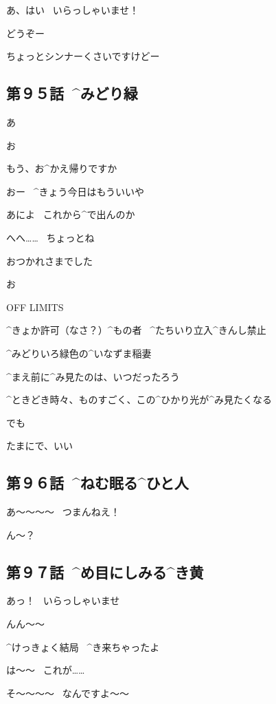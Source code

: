 \Alpha あ、はい
\ いらっしゃいませ！

\Alpha どうぞー

\Alpha ちょっとシンナーくさいですけどー


\subsection{第９５話\ ^{みどり}{緑}}

\page[107]
\Alpha あ

\Ojisan お

\Alpha もう、お^{かえ}{帰}りですか

\Ojisan おー
\ ^{きょう}{今日}はもういいや

\Ojisan あによ
\ これから^{で}{出}んのか

\Alpha へへ……
\ ちょっとね

\Alpha おつかれさまでした

\Ojisan お

\page[111]
\Sign OFF LIMITS

\Sign ^{きょか}{許可}（なさ？）^{もの}{者}
\ ^{たちいり}{立入}^{きんし}{禁止}

\page[112]
\Alpha ^{みどりいろ}{緑色}の^{いなずま}{稲妻}

\Alpha ^{まえ}{前}に^{み}{見}たのは、いつだったろう

\page[113]
\Alpha ^{ときどき}{時々}、ものすごく、この^{ひかり}{光}が^{み}{見}たくなる

\Alpha でも

\Alpha たまにで、いい


\subsection{第９６話\ ^{ねむ}{眠}る^{ひと}{人}}

\page[118]
\Makki あ〜〜〜〜
\ つまんねえ！

\Takahiro ん〜？


\subsection{第９７話\ ^{め}{目}にしみる^{き}{黄}}

\page[127]
\Alpha あっ！
\ いらっしゃいませ

\Person んん〜〜

\Person ^{けっきょく}{結局}
\ ^{き}{来}ちゃったよ

\Person は〜〜
\ これが……

\Alpha そ〜〜〜〜
\ なんですよ〜〜

